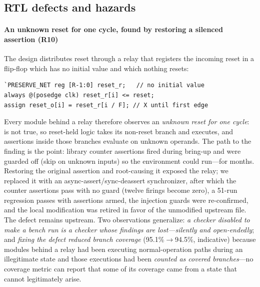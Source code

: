 \documentclass[review,12pt]{elsarticle}
\newcommand{\code}[1]{\texttt{\detokenize{#1}}}
\begin{document}
\subsection{RTL defects and hazards}
\label{sec:r10}
\paragraph{An unknown reset for one cycle, found by restoring a
	silenced assertion (R10)} The design distributes reset through a
relay that registers the incoming reset in a flip-flop which has no
initial value and which nothing resets:

\begin{lstlisting}
`PRESERVE_NET reg [R-1:0] reset_r;   // no initial value
always @(posedge clk) reset_r[i] <= reset;
assign reset_o[i] = reset_r[i / F]; // X until first edge
\end{lstlisting}

Every module behind a relay therefore observes an \emph{unknown reset
	for one cycle}: \code{if (X)} is not true, so reset-held logic takes
its non-reset branch and executes, and assertions inside those
branches evaluate on unknown operands. The path to the finding is
the point: library counter assertions fired during bring-up and were
guarded off (skip on unknown inputs) so the environment could
run---for months. Restoring the original assertion and root-causing
it exposed the relay; we replaced it with an
async-assert/sync-deassert synchronizer, after which the counter
assertions pass with no guard (twelve firings become zero), a
51-run regression passes with assertions armed, the injection guards
were re-confirmed, and the local modification was retired in favor
of the unmodified upstream file. The defect remains upstream. Two
observations generalize: \emph{a checker disabled to make a bench
	run is a checker whose findings are lost---silently and
	open-endedly}; and \emph{fixing the defect reduced branch coverage}
(95.1\%$\to$94.5\%, indicative) because modules behind a relay had
been executing normal-operation paths during an illegitimate state
and those executions had been \emph{counted as covered branches}---no
coverage metric can report that some of its coverage came from a
state that cannot legitimately arise.
\end{document}
